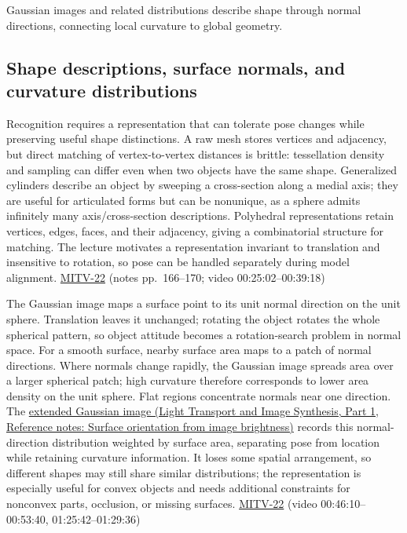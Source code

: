 \hypertarget{04-visual-computing-ii-ch032-surface-descriptions-and-gaussian-images}{}

Gaussian images and related distributions describe shape through normal directions, connecting local curvature to global geometry.

\subsection{Shape descriptions, surface normals, and curvature distributions}\label{04-visual-computing-ii-ch032-shape-descriptions-surface-normals-and-curvature-distributions}

\hypertarget{04-visual-computing-ii-ch032-shape-descriptions-surface-normals-and-curvature-distributions}{}

Recognition requires a representation that can tolerate pose changes while preserving useful shape distinctions. A raw mesh stores vertices and adjacency, but direct matching of vertex-to-vertex distances is brittle: tessellation density and sampling can differ even when two objects have the same shape. Generalized cylinders describe an object by sweeping a cross-section along a medial axis; they are useful for articulated forms but can be nonunique, as a sphere admits infinitely many axis/cross-section descriptions. Polyhedral representations retain vertices, edges, faces, and their adjacency, giving a combinatorial structure for matching. The lecture motivates a representation invariant to translation and insensitive to rotation, so pose can be handled separately during model alignment. \hyperref[04-visual-computing-ii-ch036-mitv-22---exterior-orientation-recovering-position-orientation-bundle-adjustment-object-shape]{MITV-22} (notes pp.~166--170; video 00:25:02--00:39:18)

The Gaussian image maps a surface point to its unit normal direction on the unit sphere. Translation leaves it unchanged; rotating the object rotates the whole spherical pattern, so object attitude becomes a rotation-search problem in normal space. For a smooth surface, nearby surface area maps to a patch of normal directions. Where normals change rapidly, the Gaussian image spreads area over a larger spherical patch; high curvature therefore corresponds to lower area density on the unit sphere. Flat regions concentrate normals near one direction. The \href{../04-Light-Transport-and-Image-Synthesis-P01/main.pdf\#nameddest=appendix-89b2d5b7c9e1}{extended Gaussian image (Light Transport and Image Synthesis, Part 1, Reference notes: Surface orientation from image brightness)} records this normal-direction distribution weighted by surface area, separating pose from location while retaining curvature information. It loses some spatial arrangement, so different shapes may still share similar distributions; the representation is especially useful for convex objects and needs additional constraints for nonconvex parts, occlusion, or missing surfaces. \hyperref[04-visual-computing-ii-ch036-mitv-22---exterior-orientation-recovering-position-orientation-bundle-adjustment-object-shape]{MITV-22} (video 00:46:10--00:53:40, 01:25:42--01:29:36)

